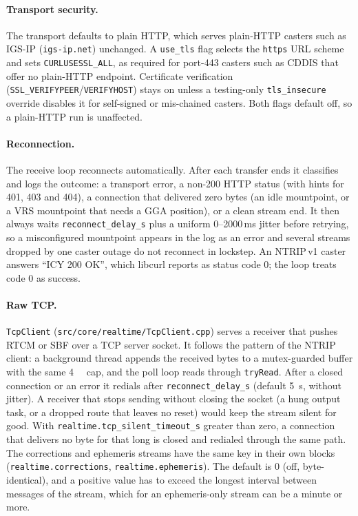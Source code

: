 \documentclass[main.tex]{subfiles}
\begin{document}
\paragraph{Transport security.}
The transport defaults to plain HTTP, which serves plain-HTTP casters
such as IGS-IP (\texttt{igs-ip.net}) unchanged.  A \texttt{use\_tls}
flag selects the \texttt{https} URL scheme and sets
\texttt{CURLUSESSL\_ALL}, as required for port-443 casters such as CDDIS
that offer no plain-HTTP endpoint.  Certificate verification
(\texttt{SSL\_VERIFYPEER}/\texttt{VERIFYHOST}) stays on unless a
testing-only \texttt{tls\_insecure} override disables it for self-signed
or mis-chained casters.  Both flags default off, so a plain-HTTP run is
unaffected.

\paragraph{Reconnection.}
The receive loop reconnects automatically.  After each transfer ends it
classifies and logs the outcome: a transport error, a non-200 HTTP
status (with hints for 401, 403 and 404), a connection that delivered
zero bytes (an idle mountpoint, or a VRS mountpoint that needs a GGA
position), or a clean stream end.  It then always waits
\texttt{reconnect\_delay\_s} plus a uniform 0--2000\,ms jitter before
retrying, so a misconfigured mountpoint appears in the log as an error
and several streams dropped by one caster outage do not reconnect in
lockstep.  An NTRIP\,v1 caster answers ``ICY 200 OK'', which libcurl
reports as status code 0; the loop treats code 0 as success.

\paragraph{Raw TCP.}
\texttt{TcpClient} (\texttt{src/core/realtime/TcpClient.cpp}) serves a
receiver that pushes RTCM or SBF over a TCP server socket.  It follows the
pattern of the NTRIP client: a background thread appends the received bytes
to a mutex-guarded buffer with the same \SI{4}{\mebi\byte} cap, and the poll
loop reads through \texttt{tryRead}.  After a closed connection or an error it
redials after \texttt{reconnect\_delay\_s} (default \SI{5}{\second}, without
jitter).  A receiver that stops sending without closing the socket (a hung
output task, or a dropped route that leaves no reset) would keep the stream
silent for good.  With \texttt{realtime.tcp\_silent\_timeout\_s} greater than
zero, a connection that delivers no byte for that long is closed and redialed
through the same path.  The corrections and ephemeris streams have the same key
in their own blocks (\texttt{realtime.corrections},
\texttt{realtime.ephemeris}).  The default is $0$ (off, byte-identical), and
a positive value has to exceed the longest interval between messages of the
stream, which for an ephemeris-only stream can be a minute or more.
\end{document}
